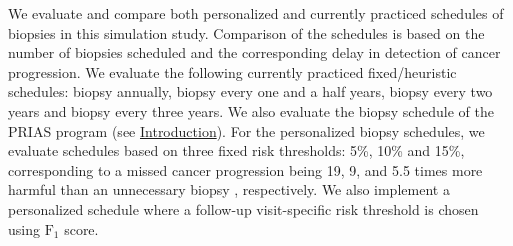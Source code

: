 We evaluate and compare both personalized and currently practiced schedules of biopsies in this simulation study. Comparison of the schedules is based on the number of biopsies scheduled and the corresponding delay in detection of cancer progression. We evaluate the following currently practiced fixed/heuristic schedules: biopsy annually, biopsy every one and a half years, biopsy every two years and biopsy every three years. We also evaluate the biopsy schedule of the PRIAS program (see \hyperref[sec:introduction]{Introduction}). For the personalized biopsy schedules, we evaluate schedules based on three fixed risk thresholds: 5\%, 10\% and 15\%, corresponding to a missed cancer progression being 19, 9, and 5.5 times more harmful than an unnecessary biopsy \cite{vickers2006decision}, respectively. We also implement a personalized schedule where a follow-up visit-specific risk threshold is chosen using $\mbox{F}_1$ score.